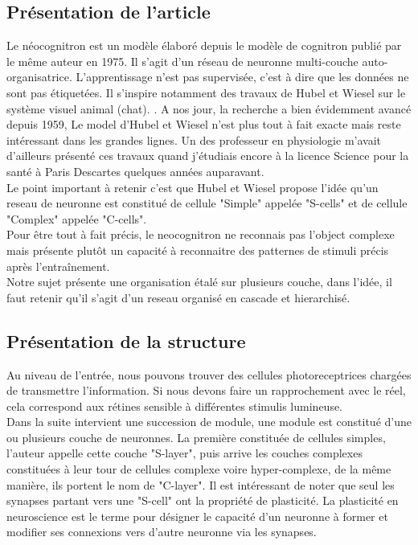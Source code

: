 \documentclass[12pt, letterpaper]{article}
\begin{document}
\subsection{Présentation de l'article}
Le néocognitron est un modèle élaboré depuis le modèle de cognitron publié par le même auteur en 1975. 
Il s'agit d'un réseau de neuronne multi-couche auto-organisatrice. L'apprentissage n'est pas supervisée, c'est à dire que 
les données ne sont pas étiquetées. Il s'inspire notamment des travaux de Hubel et Wiesel sur le système visuel animal (chat).
\autocite{HubelWiesel:2}. A nos jour, la recherche a bien évidemment avancé depuis 1959, Le model d'Hubel et Wiesel n'est plus tout à fait exacte 
mais reste intéressant dans les grandes lignes. Un des professeur en physiologie m'avait d'ailleurs présenté ces travaux quand j'étudiais encore à la 
licence Science pour la santé à Paris Descartes quelques années auparavant. \\
Le point important à retenir c'est que Hubel et Wiesel propose l'idée qu'un reseau de neuronne est 
constitué de cellule "Simple" appelée "S-cells" et de cellule "Complex" appelée "C-cells".\\
Pour être tout à fait précis, le neocognitron ne reconnais pas l'object complexe mais présente plutôt un 
capacité à reconnaitre des patternes de stimuli précis après l'entraînement.\\
Notre sujet présente une organisation étalé sur plusieurs couche, dans l'idée, il faut retenir qu'il s'agit d'un reseau organisé en cascade et hierarchisé.

\subsection{Présentation de la structure}
Au niveau de l'entrée, nous pouvons trouver des cellules photoreceptrices chargées de transmettre l'information. Si nous devons faire un rapprochement avec le réel, cela correspond aux rétines sensible à différentes stimulis lumineuse.\\
Dans la suite intervient une succession de module, une module est constitué d'une ou plusieurs couche de neuronnes.
La première constituée de cellules simples, l'auteur appelle cette couche "S-layer", puis arrive les couches complexes constituées 
à leur tour de cellules complexe voire hyper-complexe, de la même manière, ils portent le nom de "C-layer".
Il est intéressant de noter que seul les synapses partant vers une "S-cell" ont la propriété de plasticité. La plasticité en neuroscience 
est le terme pour désigner le capacité d'un neuronne à former et modifier ses connexions vers d'autre neuronne via les synapses. 
\end{document}
